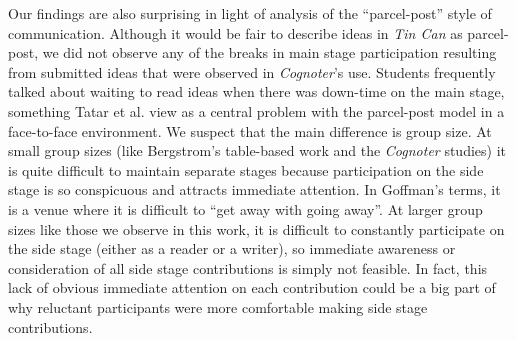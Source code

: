 Our findings are also surprising in light of  analysis of the ``parcel-post'' style of communication. Although it would be fair to describe ideas in \emph{Tin Can} as parcel-post, we did not observe any of the breaks in main stage participation resulting from submitted ideas that were observed in \emph{Cognoter}'s use. Students frequently talked about waiting to read ideas when there was down-time on the main stage, something Tatar et al. view as a central problem with the parcel-post model in a face-to-face environment. We suspect that the main difference is group size. At small group sizes (like Bergstrom's table-based work and the \emph{Cognoter} studies) it is quite difficult to maintain separate stages because participation on the side stage is so conspicuous and attracts immediate attention. In Goffman's terms, it is a venue where it is difficult to ``get away with going away''. At larger group sizes like those we observe in this work, it is difficult to constantly participate on the side stage (either as a reader or a writer), so immediate awareness or consideration of all side stage contributions is simply not feasible. In fact, this lack of obvious immediate attention on each contribution could be a big part of why reluctant participants were more comfortable making side stage contributions. 




